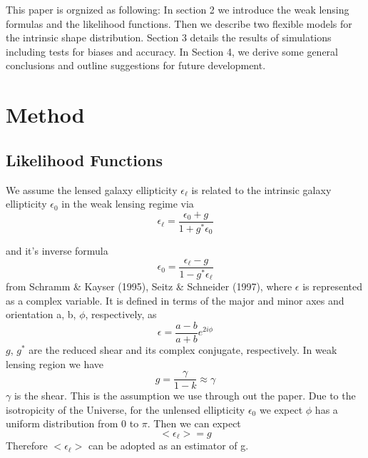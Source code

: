 \documentclass[useAMS,usenatbib]{mn2e}
\begin{document}
This paper is orgnized as following: In section 2 we introduce the
weak lensing formulas and the likelihood functions. Then we describe
two flexible models for the intrinsic shape distribution. Section 3 details
the results of simulations including tests for biases and accuracy. In Section 4, we
derive some general conclusions and outline suggestions for future
development.




\section{Method}

\label{sec:XXX}


\subsection{Likelihood Functions}

We assume the lensed galaxy ellipticity $\epsilon_{\ell}$ is related
to the intrinsic galaxy ellipticity $\epsilon_{0}$ in the weak lensing
regime via 
\begin{equation}
\epsilon_{\ell}=\frac{\epsilon_{0}+g}{1+g^{*}\epsilon_{0}}
\end{equation}


and it's inverse formula 
\begin{equation}
\epsilon_{0}=\frac{\epsilon_{\ell}-g}{1-g^{*}\epsilon_{\ell}}
\end{equation}
from Schramm \& Kayser (1995), Seitz \& Schneider (1997), where $\epsilon$
is represented as a complex variable. It is defined in terms of the major and minor axes and orientation a, b, $\phi$,
respectively, as
\begin{equation}
\epsilon=\frac{a-b}{a+b}e^{2i\phi}
\end{equation}
$g$, $g^{*}$ are the reduced shear and its complex conjugate, respectively. In weak lensing region we have 
\begin{equation}
g=\frac{\gamma}{1-k}\approx\gamma
\end{equation}
$\gamma$ is the shear. This is the assumption we use through out
the paper.
Due to the isotropicity of the Universe, for the unlensed ellipticity $\epsilon_{0}$ 
we expect $\phi$ has a uniform distribution
from 0 to $\pi$. Then we can expect 
\begin{equation}
<\epsilon_{\ell}>=g
\end{equation}
Therefore $<\epsilon_{\ell}>$ can be adopted as an estimator of g.
\end{document}
